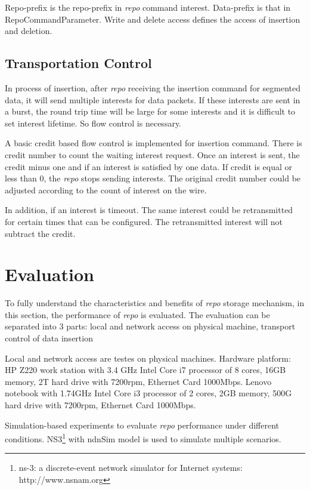 \documentclass[conference]{IEEEtran}
\begin{document}
Repo-prefix is the repo-prefix in \emph{repo} command interest. Data-prefix is that in RepoCommandParameter. Write and delete access defines the access of insertion and deletion.

\subsection{Transportation Control}
In process of insertion, after \emph{repo} receiving the insertion command for segmented data, it will send multiple interests for data packets. If these interests are sent in a burst, the round trip time will be large for some interests and it is difficult to set interest lifetime. So flow control is necessary.

A basic credit based flow control is implemented for insertion command. There is credit number to count the waiting interest request. Once an interest is sent, the credit minus one and if an interest is satisfied by one data. If credit is equal or less than 0, the \emph{repo} stops sending interests. The original credit number could be adjusted according to the count of interest on the wire.

In addition, if an interest is timeout. The same interest could be retransmitted for certain times that can be configured. The retransmitted interest will not subtract the credit.

\section{Evaluation} \label{section-evaluation}

To fully understand the characteristics and benefits of \emph{repo} storage mechanism, in this section, the performance of \emph{repo} is evaluated. The evaluation can be separated into 3 parts: local and network access on physical machine, transport control of data insertion

Local and network access are testes on physical machines. Hardware platform: HP Z220 work station with 3.4 GHz Intel Core i7 processor of 8 cores, 16GB memory, 2T hard drive with 7200rpm, Ethernet Card 1000Mbps.  Lenovo notebook with 1.74GHz Intel Core i3 processor of 2 cores, 2GB memory, 500G hard drive with 7200rpm, Ethernet Card 1000Mbps.

Simulation-based experiments to evaluate \emph{repo} performance under different conditions. NS3\footnote{ns-3: a discrete-event network simulator for Internet systems:
http://www.nsnam.org} with ndnSim \cite{afanasyev2012ndnsim} model is used to simulate multiple scenarios.
\end{document}

